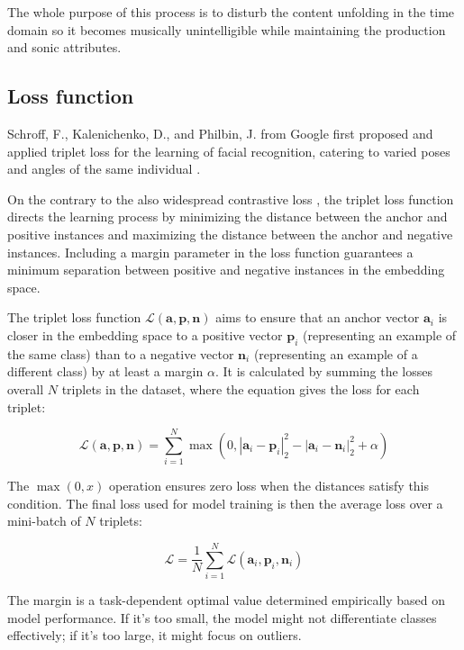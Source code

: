 The whole purpose of this process is to disturb the content unfolding in the time domain so it becomes musically unintelligible while maintaining the production and sonic attributes.

\subsection{Loss function}
\label{subsec:loss-function}

Schroff, F., Kalenichenko, D., and Philbin, J. from Google first proposed and applied triplet loss for the learning of facial recognition, catering to varied poses and angles of the same individual \cite{Schroff2015FaceNet:Clustering}.

On the contrary to the also widespread contrastive loss \cite{supercontrast}, the triplet loss function directs the learning process by minimizing the distance between the anchor and positive instances and maximizing the distance between the anchor and negative instances. Including a margin parameter in the loss function guarantees a minimum separation between positive and negative instances in the embedding space.

The triplet loss function $\mathcal{L}(\mathbf{a}, \mathbf{p}, \mathbf{n})$ aims to ensure that an anchor vector $\mathbf{a}_i$ is closer in the embedding space to a positive vector $\mathbf{p}_i$ (representing an example of the same class) than to a negative vector $\mathbf{n}_i$ (representing an example of a different class) by at least a margin $\alpha$. It is calculated by summing the losses overall $N$ triplets in the dataset, where the equation gives the loss for each triplet:

\begin{equation}
\mathcal{L}(\mathbf{a}, \mathbf{p}, \mathbf{n}) = \sum_{i=1}^{N} \max \left(0, \left| \mathbf{a}_i - \mathbf{p}_i \right|_2^2 - \left| \mathbf{a}_i - \mathbf{n}_i \right|_2^2 + \alpha \right)
\end{equation}

The $\max(0, x)$ operation ensures zero loss when the distances satisfy this condition. The final loss used for model training is then the average loss over a mini-batch of $N$ triplets:

\begin{equation}
\mathcal{L} = \frac{1}{N} \sum_{i=1}^{N} \mathcal{L}(\mathbf{a}_i, \mathbf{p}_i, \mathbf{n}_i)
\end{equation}

The margin is a task-dependent optimal value determined empirically based on model performance. If it's too small, the model might not differentiate classes effectively; if it's too large, it might focus on outliers.

